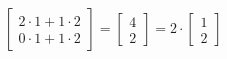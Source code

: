 \documentclass[preview]{standalone}
\begin{document}
\begin{align*}
\begin{bmatrix} 2 \cdot 1 + 1 \cdot 2 \\ 0 \cdot 1 + 1 \cdot 2 \end{bmatrix} = \begin{bmatrix} 4 \\ 2 \end{bmatrix} = 2 \cdot \begin{bmatrix} 1 \\ 2 \end{bmatrix}
\end{align*}
\end{document}
